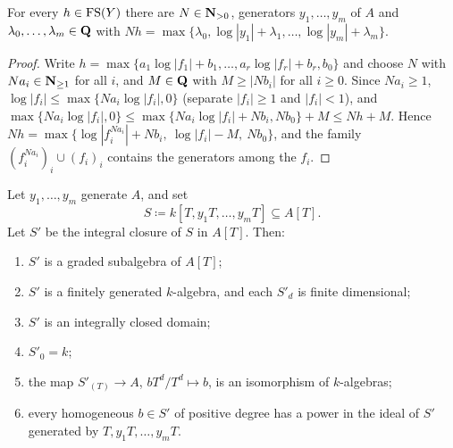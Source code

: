 \begin{lemma}\label{lem:wu-fs-normal-form}
\leanok
{}
For every $h\in\mathrm{FS}(Y)$ there are $N\in\mathbf{N}_{>0}$, generators $y_1,\dots,y_m$ of $A$ and
$\lambda_0,\dots,\lambda_m\in\mathbf{Q}$ with $Nh=\max\{\lambda_0,\log|y_1|+\lambda_1,\dots,\log|y_m|+\lambda_m\}$.
\end{lemma}

\begin{proof}
Write $h=\max\{a_1\log|f_1|+b_1,\dots,a_r\log|f_r|+b_r,b_0\}$ and choose $N$ with $Na_i\in\mathbf{N}_{\ge1}$ for all $i$,
and $M\in\mathbf{Q}$ with $M\ge|Nb_i|$ for all $i\ge0$. Since $Na_i\ge1$, $\log|f_i|\le\max\{Na_i\log|f_i|,0\}$ (separate
$|f_i|\ge1$ and $|f_i|<1$), and $\max\{Na_i\log|f_i|,0\}\le\max\{Na_i\log|f_i|+Nb_i,Nb_0\}+M\le Nh+M$. Hence
$Nh=\max\{\log|f_i^{Na_i}|+Nb_i,\ \log|f_i|-M,\ Nb_0\}$, and the family $(f_i^{Na_i})_i\cup(f_i)_i$ contains the
generators among the $f_i$.
\end{proof}

\begin{lemma}\label{lem:wu-graded-closure}
\leanok
{}
Let $y_1,\dots,y_m$ generate $A$, and set
\[
S\coloneqq k[T,y_1T,\dots,y_mT]\subseteq A[T].
\]
Let $S'$ be the integral closure of $S$ in $A[T]$. Then:
\begin{enumerate}
\item $S'$ is a graded subalgebra of $A[T]$;
\item $S'$ is a finitely generated $k$-algebra, and each $S'_d$ is finite dimensional;
\item $S'$ is an integrally closed domain;
\item $S'_0=k$;
\item the map $S'_{(T)}\to A$, $bT^d/T^d\mapsto b$, is an isomorphism of $k$-algebras;
\item every homogeneous $b\in S'$ of positive degree has a power in the ideal of $S'$ generated by
$T,y_1T,\dots,y_mT$.
\end{enumerate}
\end{lemma}


